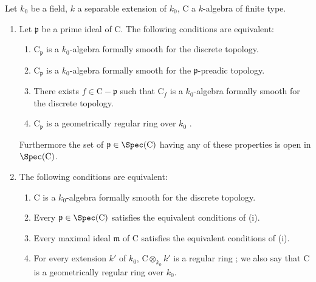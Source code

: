 \begin{proposition}[22.6.7]
\label{0.22.6.7}
Let $k_0$ be a field, $k$ a separable extension of $k_0$, $\mathrm{C}$ a $k$-algebra of finite type.
\begin{enumerate}
  \item[\rm{(i)}] Let $\mathfrak{p}$ be a prime ideal of $\mathrm{C}$.
  The following conditions are equivalent:
  \begin{enumerate}
    \item[a)] $\mathrm{C}_\mathfrak{p}$ is a $k_0$-algebra formally smooth for the discrete topology.
    \item[b)] $\mathrm{C}_\mathfrak{p}$ is a $k_0$-algebra formally smooth for the $\mathfrak{p}$-preadic topology.
    \item[c)] There exists $f\in\mathrm{C}-\mathfrak{p}$ such that $\mathrm{C}_f$ is a $k_0$-algebra formally smooth for the discrete topology.
    \item[d)] $\mathrm{C}_\mathfrak{p}$ is a geometrically regular ring over $k_0$ .
  \end{enumerate}
  Furthermore the set of $\mathfrak{p}\in\Spec(\mathrm{C})$ having any of these properties is open in $\Spec(\mathrm{C})$.
  \item[\rm{(ii)}] The following conditions are equivalent:
  \begin{enumerate}
    \item[a)] $\mathrm{C}$ is a $k_0$-algebra formally smooth for the discrete topology.
    \item[b)] Every $\mathfrak{p}\in\Spec(\mathrm{C})$ satisfies the equivalent conditions of (i).
    \item[c)] Every maximal ideal $\mathfrak{m}$ of $\mathrm{C}$ satisfies the equivalent conditions of (i).
    \item[d)] For every extension $k'$ of $k_0$, $\mathrm{C}\otimes_{k_0}k'$ is a regular ring ; we also say that $\mathrm{C}$ is a geometrically regular ring over $k_0$.
  \end{enumerate}
\end{enumerate}
\end{proposition}

